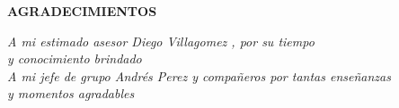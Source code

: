\begin{titlepage}
    \begin{center}
        
        {\large \bf AGRADECIMIENTOS}\\[1cm]
        \vspace*{13cm} %
        
        \begin{flushright}

            \textit{A mi estimado asesor Diego Villagomez , por su tiempo}\\[0.5cm]
            \textit{ y conocimiento brindado}\\[1.5cm]
            \textit{A mi jefe de grupo Andrés Perez y compañeros por tantas enseñanzas}\\[0.5cm]
            \textit{ y momentos agradables}\\[0.5cm]
            \end{flushright}

        \vfill %
    \end{center}
\end{titlepage}

